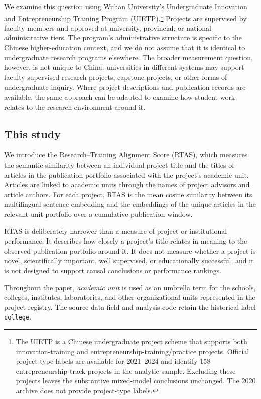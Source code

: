 \documentclass[pdflatex,sn-apa]{sn-jnl}
\begin{document}
We examine this question using Wuhan University's Undergraduate Innovation and Entrepreneurship Training Program (UIETP).\footnote{The UIETP is a Chinese undergraduate project scheme that supports both innovation-training and entrepreneurship-training/practice projects. Official project-type labels are available for 2021--2024 and identify 158 entrepreneurship-track projects in the analytic sample. Excluding these projects leaves the substantive mixed-model conclusions unchanged. The 2020 archive does not provide project-type labels.} Projects are supervised by faculty members and approved at university, provincial, or national administrative tiers. The program's administrative structure is specific to the Chinese higher-education context, and we do not assume that it is identical to undergraduate research programs elsewhere. The broader measurement question, however, is not unique to China: universities in different systems may support faculty-supervised research projects, capstone projects, or other forms of undergraduate inquiry. Where project descriptions and publication records are available, the same approach can be adapted to examine how student work relates to the research environment around it.

\subsection{This study}

We introduce the Research--Training Alignment Score (RTAS), which measures the semantic similarity between an individual project title and the titles of articles in the publication portfolio associated with the project's academic unit. Articles are linked to academic units through the names of project advisors and article authors. For each project, RTAS is the mean cosine similarity between its multilingual sentence embedding and the embeddings of the unique articles in the relevant unit portfolio over a cumulative publication window.

RTAS is deliberately narrower than a measure of project or institutional performance. It describes how closely a project's title relates in meaning to the observed publication portfolio around it. It does not measure whether a project is novel, scientifically important, well supervised, or educationally successful, and it is not designed to support causal conclusions or performance rankings.

Throughout the paper, \emph{academic unit} is used as an umbrella term for the schools, colleges, institutes, laboratories, and other organizational units represented in the project registry. The source-data field and analysis code retain the historical label \texttt{college}.
\end{document}
